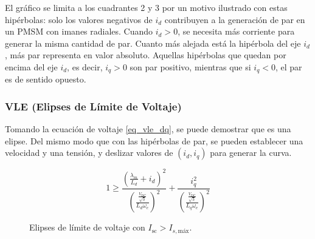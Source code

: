El gráfico se limita a los cuadrantes 2 y 3 por un motivo ilustrado con estas hipérbolas: solo los valores negativos de \(i_d\) contribuyen a la generación de par en un PMSM con imanes radiales. Cuando \(i_d>0\), se necesita más corriente para generar la misma cantidad de par. Cuanto más alejada está la hipérbola del eje \(i_d\), más par representa en valor absoluto. Aquellas hipérbolas que quedan por encima del eje \(i_d\), es decir, \(i_q > 0\) son par positivo, mientras que si \(i_q < 0\), el par es de sentido opuesto.

\subsubsection{VLE (Elipses de Límite de Voltaje)}

Tomando la ecuación de voltaje \ref{eq_vle_dq}, se puede demostrar que es una elipse. Del mismo modo que con las hipérbolas de par, se pueden establecer una velocidad y una tensión, y deslizar valores de \((i_d, i_q)\) para generar la curva.

\begin{equation}
1 \geq \frac{\left(\frac{\lambda_m}{L_d}+i_d\right)^2}{\left(\frac{\frac{V_{\text{DC}}}{\sqrt{3}}}{L_d\omega_e}\right)^2}+\frac{i_q^2}{\left(\frac{\frac{V_{\text{DC}}}{\sqrt{3}}}{L_q\omega_e}\right)^2}
\end{equation}




\begin{figure}[H]
  \centering
  \caption{Elipses de límite de voltaje con $I_{\text{sc}} > I_{s,\text{máx}}$.}
\end{figure}


